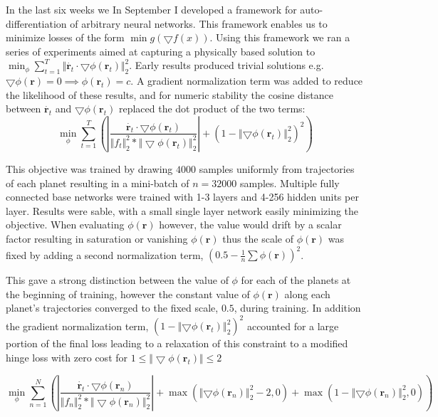 \documentclass[10pt,letterpaper]{report}
\author{Brandon Houghton}
\begin{document}
In the last six weeks we 
In September I developed a framework for auto-differentiation of arbitrary neural networks. This framework enables us to minimize losses of the form $\min{g(\bigtriangledown f(x))} $. Using this framework we ran a series of experiments aimed at capturing a physically based solution to $ \min_{\phi} \sum^{T}_{t = 1} \Vert \dot{\pmb{r}_t} \cdot \bigtriangledown \phi \left( \pmb{r}_t \right) \Vert^2_2 $.
Early results produced trivial solutions e.g. $\bigtriangledown \phi(\pmb{r}) = 0 \implies \phi(\pmb{r}_t) = c$. A gradient normalization term was added to reduce the likelihood of these results, and for numeric stability the cosine distance between $\dot{\pmb{r}_t}$ and $\bigtriangledown \phi (\pmb{r}_t)$ replaced the dot product of the two terms:
$$ 
\min_{\phi} \sum^{T}_{t = 1} 
\left( \left\vert
\frac{\dot{\pmb{r}_t} \cdot \bigtriangledown \phi \left( \pmb{r}_t \right)}{{\Vert f_t \Vert}^2_2 * {\Vert \bigtriangledown \phi (\pmb{r}_t) \Vert}^2_2}
\right \vert
+ \left( 1-\left\Vert \bigtriangledown \phi \left( \pmb{r}_t \right) \right\Vert^2_2 \right)^2 \right)
$$

This objective was trained by drawing $4000$ samples uniformly from trajectories of each planet resulting in a mini-batch of $n = 32000$ samples. Multiple fully connected base networks were trained with 1-3 layers and 4-256 hidden units per layer. Results were sable, with a small single layer network easily minimizing the objective. 
When evaluating $\phi(\pmb{r})$ however, the value would drift by a scalar factor resulting in saturation or vanishing $\phi(\pmb{r})$ thus the scale of $\phi(\pmb{r})$ was fixed by adding a second normalization term, $( 0.5 - \frac{1}{n}\sum\phi(\pmb{r}))^2$.

This gave a strong distinction between the value of $\phi$ for each of the planets at the beginning of training, however the constant value of $\phi(\pmb{r})$ along each planet's trajectories converged to the fixed scale, $0.5$, during training. In addition the gradient normalization term, $( 1-\left\Vert \bigtriangledown \phi \left( \pmb{r}_t \right) \right\Vert^2_2 )^2$ accounted for a large portion of the final loss leading to a relaxation of this constraint to a modified hinge loss with zero cost for $ 1 \leq \Vert \bigtriangledown \phi \left( \pmb{r}_t \right) \Vert \leq 2$

$$ 
\min_{\phi} \sum^{N}_{n = 1} 
\left( 
	\left\vert
	\frac{\dot{\pmb{r}_t} \cdot \bigtriangledown \phi \left( \pmb{r}_n \right)}{{\Vert f_n \Vert}^2_2 * {\Vert \bigtriangledown \phi (\pmb{r}_n) \Vert}^2_2}
	\right \vert
+ \max{\left(\left\Vert \bigtriangledown \phi \left( \pmb{r}_n \right) \right\Vert^2_2 - 2, 0\right)}
+ \max{\left(1 - \left\Vert \bigtriangledown \phi \left( \pmb{r}_n \right) \right\Vert^2_2, 0\right)}
\right)
$$
\end{document}
